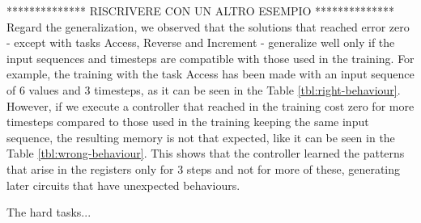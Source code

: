 ************** RISCRIVERE CON UN ALTRO ESEMPIO **************
Regard the generalization, we observed that the solutions that reached error zero - except with tasks Access, Reverse and Increment - generalize well only if the input sequences and timesteps are compatible with those used in the training. For example, the training with the task Access has been made with an input sequence of 6 values and 3 timesteps, as it can be seen in the Table \ref{tbl:right-behaviour}. However, if we execute a controller that reached in the training cost zero for more timesteps compared to those used in the training keeping the same input sequence, the resulting memory is not that expected, like it can be seen in the Table \ref{tbl:wrong-behaviour}. This shows that the controller learned the patterns that arise in the registers only for 3 steps and not for more of these, generating later circuits that have unexpected behaviours.\newline
\begin{table}[t]
	\centering
	\caption{Wrong behaviour obtained with the task Access, executing for 5 timesteps the controller that reached cost zero and trained without Curriculum Learning. The controller continues to access the position of the memory indicated at the index 0.}
	\label{tbl:wrong-behaviour}
\end{table}
\fi
The hard tasks...\newline

